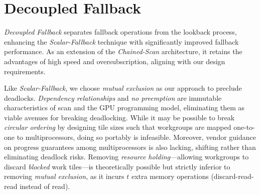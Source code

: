 \documentclass[sigconf]{acmart}
\begin{document}
\section{Decoupled Fallback}
\emph{Decoupled Fallback} separates fallback operations from the lookback process, enhancing the \emph{Scalar-Fallback} technique with significantly improved fallback performance. As an extension of the \emph{Chained-Scan} architecture, it retains the advantages of high speed and oversubscription, aligning with our design requirements.

Like \emph{Scalar-Fallback}, we choose \emph{mutual exclusion} as our approach to preclude deadlocks. \emph{Dependency relationships} and \emph{no preemption} are immutable characteristics of scan and the GPU programming model, eliminating them as viable avenues for breaking deadlocking. While it may be possible to break \emph{circular ordering} by designing tile sizes such that workgroups are mapped one-to-one to multiprocessors, doing so portably is infeasible. Moreover, vendor guidance on progress guarantees among multiprocessors is also lacking, shifting rather than eliminating deadlock risks. Removing \emph{resource holding}---allowing workgroups to discard \emph{blocked} work tiles---is theoretically possible but strictly inferior to removing \emph{mutual exclusion}, as it incurs $t$ extra memory operations (discard-read-read instead of read).
\end{document}
